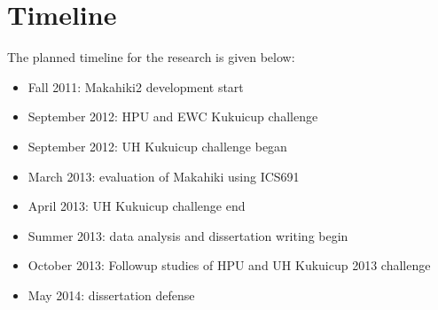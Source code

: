 \section{Timeline}

The planned timeline for the research is given below:

\begin{itemize}
	\item Fall 2011: Makahiki2 development start
	\item September 2012: HPU and EWC Kukuicup challenge
    \item September 2012: UH Kukuicup challenge began
	\item March 2013: evaluation of Makahiki using ICS691
    \item April 2013: UH Kukuicup challenge end
	\item Summer 2013: data analysis and dissertation writing begin
	\item October 2013: Followup studies of HPU and UH Kukuicup 2013 challenge
	\item May 2014: dissertation defense
\end{itemize}
